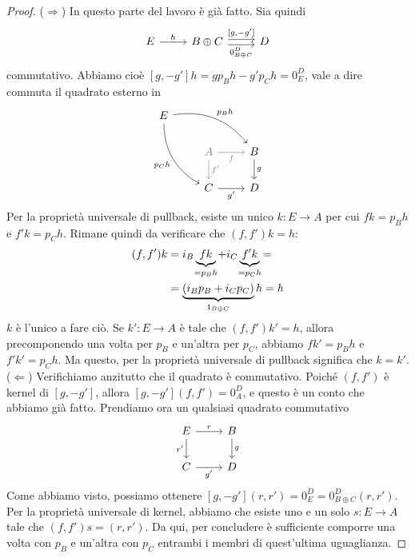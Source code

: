 \begin{proof}
  (\(\Rightarrow\)) In questo parte del lavoro è già fatto. Sia quindi
  \[
    \begin{tikzcd}
      E \ar["{h}", r] & B \oplus C \ar["{[g, -g']}", r, shift left]
      \ar["{0_{B \oplus C}^D}", r, shift right, swap] & D
    \end{tikzcd}
  \]
  commutativo. Abbiamo cioè \([g, -g'] h = g p_B h - g' p_C h = 0_E^D\),
  vale a dire commuta il quadrato esterno in
  \[
    \begin{tikzcd}
      E \ar["{p_B h}", drr, bend left] \ar["{p_C h}", ddr, swap,
      bend right] \\
      & {\color{gray} A} \ar["{f}" gray, gray, r, swap] \ar["{f'}" gray, gray, d] & B \ar["{g}", d] \\
      & C \ar["{g'}", r, swap] & D
    \end{tikzcd}
  \]
  Per la proprietà universale di pullback, esiste un unico
  \(k : E \to A\) per cui \(f k = p_B h\) e \(f' k = p_C h\). Rimane
  quindi da verificare che \((f, f') k = h\):
  \begin{align*}
    (f, f') k &= i_B \underbrace{f k}_{\crampedclap{=p_B h}} + i_C \underbrace{f' k}_{\crampedclap{=p_C h}} = \\
              &= \underbrace{(i_B p_B + i_C p_C)}_{\id_{B \oplus C}} h = h
  \end{align*}
  \(k\) è l'unico a fare ciò. Se \(k' : E \to A\) è tale che
  \((f, f') k' = h\), allora precomponendo una volta per \(p_B\) e
  un'altra per \(p_C\), abbiamo \(f k' = p_B h\) e \(f' k' = p_C h\). Ma
  questo, per la proprietà universale di pullback significa che
  \(k = k'\).\newline (\(\Leftarrow\)) Verifichiamo anzitutto che il quadrato è
  commutativo. Poiché \((f, f')\) è kernel di \([g, -g']\), allora
  \([g, -g'] (f, f') = 0_A^D\), e questo è un conto che abbiamo già
  fatto. Prendiamo ora un qualsiasi quadrato commutativo
  \[
    \begin{tikzcd}
      E \ar["{r}", r] \ar["{r'}", d, swap] & B \ar["{g}", d] \\
      C \ar["{g'}", r, swap] & D
    \end{tikzcd}
  \]
  Come abbiamo visto, possiamo ottenere
  \([g, -g'] (r, r') = 0_E^D = 0_{B \oplus C}^D (r, r')\). Per la proprietà
  universale di kernel, abbiamo che esiste uno e un solo \(s : E \to A\)
  tale che \((f, f') s = (r, r')\). Da qui, per concludere è sufficiente
  comporre una volta con \(p_B\) e un'altra con \(p_C\) entrambi i membri
  di quest'ultima uguaglianza.
\end{proof}


